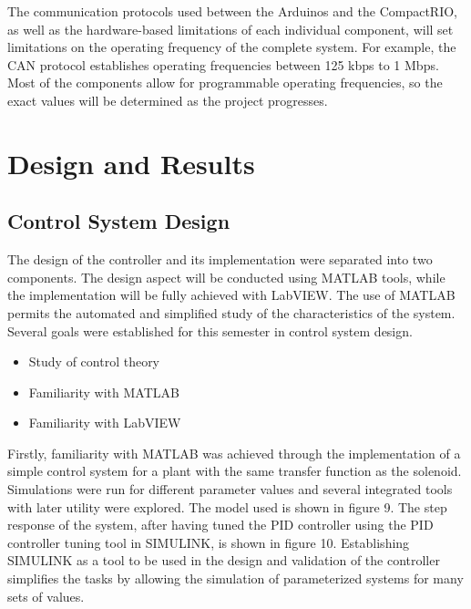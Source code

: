 \documentclass{article}
\begin{document}
\begin{flushleft}
The communication protocols used between the Arduinos and the CompactRIO, as well as the hardware-based limitations of each individual component, will set limitations on the operating frequency of the complete system. For example, the CAN protocol establishes operating frequencies between 125 kbps to 1 Mbps. Most of the components allow for programmable operating frequencies, so the exact values will be determined as the project progresses. 
\end{flushleft}

\section{Design and Results}
\subsection{Control System Design}

\begin{flushleft}
The design of the controller and its implementation were separated into two components. The design aspect will be conducted using MATLAB tools, while the implementation will be fully achieved with LabVIEW. The use of MATLAB permits the automated and simplified study of the characteristics of the system. Several goals were established for this semester in control system design. 
\end{flushleft}

\begin{itemize}
	\item Study of control theory
    \item Familiarity with MATLAB
    \item Familiarity with LabVIEW
\end{itemize}

\begin{flushleft}
Firstly, familiarity with MATLAB was achieved through the implementation of a simple control system for a plant with the same transfer function as the solenoid. Simulations were run for different parameter values and several integrated tools with later utility were explored. The model used is shown in figure 9. The step response of the system, after having tuned the PID controller using the PID controller tuning tool in SIMULINK, is shown in figure 10. Establishing SIMULINK as a tool to be used in the design and validation of the controller simplifies the tasks by allowing the simulation of parameterized systems for many sets of values.
\end{flushleft}
\end{document}
